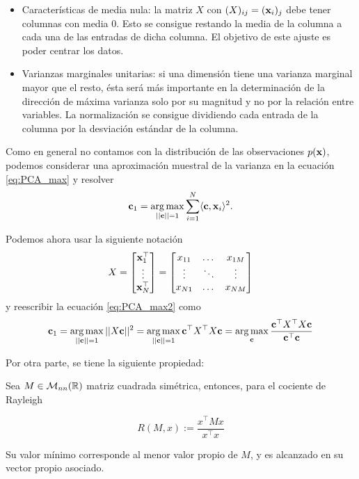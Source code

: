 \begin{itemize}
	\item Características de media nula: la matriz $X$ con $(X)_{ij} = (\mathbf{x}_i)_j$ debe tener columnas con media $0$. Esto se consigue restando la media de la columna a cada una de las entradas de dicha columna. El objetivo de este ajuste es poder centrar los datos.
	\item Varianzas marginales unitarias: si una dimensión tiene una varianza marginal mayor que el resto, ésta será más importante en la determinación de la dirección de máxima varianza solo por su magnitud y no por la relación entre variables. La normalización se consigue dividiendo cada entrada de la columna por la desviación estándar de la columna.
\end{itemize}

Como en general no contamos con la distribución de las observaciones $p(\mathbf{x})$, podemos considerar una aproximación muestral de la varianza en la ecuación \eqref{eq:PCA_max} y resolver 
\begin{align}
	\mathbf{c}_1 = \operatorname*{arg\,max}_{||\mathbf{c}||=1} \sum_{i=1}^N \langle\mathbf{c},\mathbf{x}_i\rangle^2.\label{eq:PCA_max2}
\end{align}

Podemos ahora usar la siguiente notación
$$
X=\begin{bmatrix}
        \mathbf{x}_1^\top\\
        \vdots\\
        \mathbf{x}_N^\top\\
        \end{bmatrix}=
        \begin{bmatrix}
        {x}_{11}    & \dots & {x}_{1M}  \\
        \vdots          & \ddots& \vdots        \\
        {x}_{N1}    & \dots & {x}_{NM}
        \end{bmatrix}
$$
y reescribir la ecuación \eqref{eq:PCA_max2} como 
\begin{equation}
	\mathbf{c}_1 = \operatorname*{arg\,max}_{||\mathbf{c}||=1} ||X\mathbf{c}||^2 
			= \operatorname*{arg\,max}_{||\mathbf{c}||=1} \mathbf{c}^\top X^\top X \mathbf{c}
			= \operatorname*{arg\,max}_{\mathbf{c}} \frac{\mathbf{c}^\top X^\top X \mathbf{c}}{\mathbf{c}^\top \mathbf{c}}
			\label{eq:PCA_max3}
\end{equation}

Por otra parte, se tiene la siguiente propiedad:

\begin{lemma}

Sea $M\in\mathcal{M}_{nn}(\mathbb{R})$ matriz cuadrada simétrica, entonces, para el cociente de Rayleigh

\begin{equation}
	R(M,x):=\frac{x^\top Mx}{x^\top x}
\end{equation}

Su valor mínimo corresponde al menor valor propio de $M$, y es alcanzado en su vector propio asociado.

\end{lemma}

